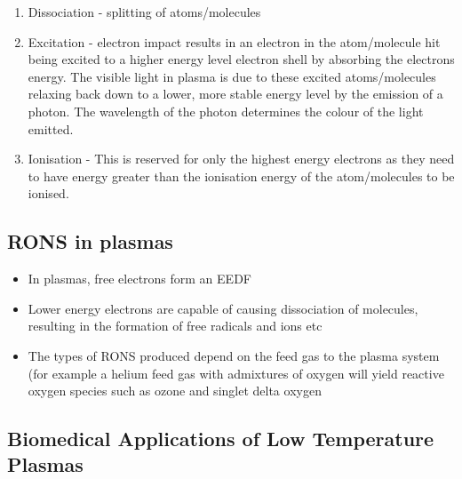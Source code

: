 \documentclass[11pt, oneside]{article}   	%
\begin{document}
\begin{itemize}
\begin{enumerate}
\item Dissociation - splitting of atoms/molecules
\item Excitation - electron impact results in an electron in the atom/molecule hit being excited to a higher energy level electron shell by absorbing the electrons energy. The visible light in plasma is due to these excited atoms/molecules relaxing back down to a lower, more stable energy level by the emission of a photon. The wavelength of the photon determines the colour of the light emitted.
\item Ionisation - This is reserved for only the highest energy electrons as they need to have energy greater than the ionisation energy of the atom/molecules to be ionised.
\end{enumerate}

\end{itemize}





\subsection{RONS in plasmas}

\begin{itemize}
\item In plasmas, free electrons form an EEDF
\item Lower energy electrons are capable of causing dissociation of molecules, resulting in the formation of free radicals and ions etc
\item The types of RONS produced depend on the feed gas to the plasma system (for example a helium feed gas with admixtures of oxygen will yield reactive oxygen species such as ozone and singlet delta oxygen \cite{Niemi2013}
\end{itemize}


\subsection{Biomedical Applications of Low Temperature Plasmas}
\end{document}
